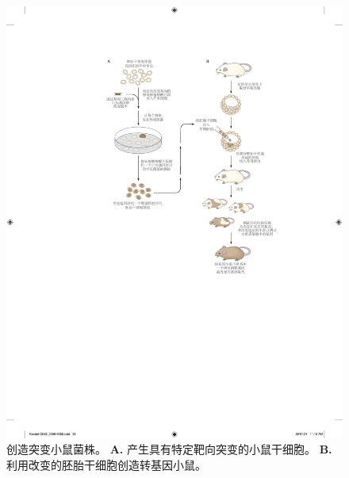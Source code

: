 \begin{figure}[htbp]
	\centering
	\includegraphics[width=0.9\linewidth]{chap02/fig_2_7}
	\caption{创造突变小鼠菌株\cite{alberts2017molecular}。
		\textbf{A.} 产生具有特定靶向突变的小鼠干细胞。
		\textbf{B.} 利用改变的胚胎干细胞创造转基因小鼠。}
	\label{fig:2_7}
\end{figure}


